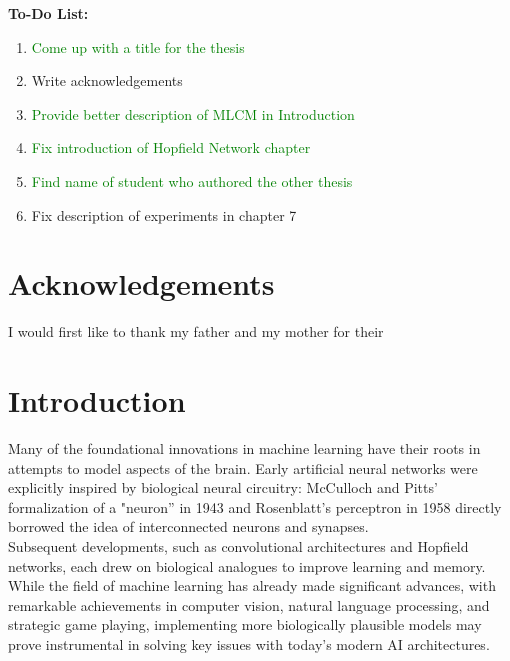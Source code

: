 \documentclass[a4paper,12pt]{report}
\begin{document}

\thispagestyle{empty}
\noindent
\textbf{To-Do List:}
\vspace*{0.5em} \\
\begin{enumerate}
    \item {\textcolor{green}{Come up with a title for the thesis}}
    \item Write acknowledgements
    \item \textcolor{green}{Provide better description of MLCM in Introduction}
    \item {\textcolor{green}{Fix introduction of Hopfield Network chapter}}
    \item \textcolor{green}{Find name of student who authored the other thesis}
    \item Fix description of experiments in chapter 7
\end{enumerate}


\thispagestyle{empty}\mbox{}\newpage
\thispagestyle{empty}\mbox{}\newpage
\thispagestyle{empty}
\chapter*{Acknowledgements}
I would first like to thank my father and my mother for their 

\noindent 
\newpage
\thispagestyle{empty}\mbox{}\newpage

\setcounter{page}{1}

\tableofcontents
\newpage


\chapter*{Introduction}

Many of the foundational innovations in machine learning have their roots in attempts to model aspects 
of the brain. Early artificial neural networks were explicitly inspired by biological neural 
circuitry: McCulloch and Pitts' formalization of a "neuron” in 1943 and Rosenblatt's perceptron in 
1958 directly borrowed the idea of interconnected neurons and synapses. \\
Subsequent developments, such as convolutional architectures and Hopfield networks, each drew on 
biological analogues to improve learning and memory. While the field of machine learning has already 
made significant advances, with remarkable achievements in computer vision, natural language 
processing, and strategic game playing, implementing more biologically plausible models may prove 
instrumental in solving key issues with today's modern AI architectures.
\vspace{0.5em}
\end{document}
